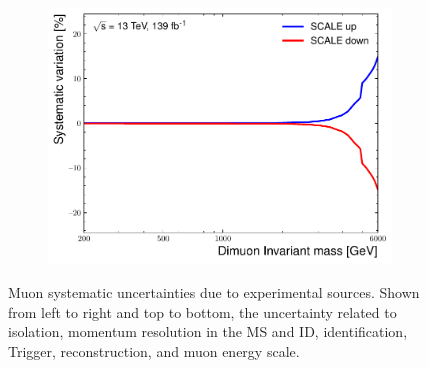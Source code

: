 \begin{figure}[]
\begin{subfigure}[b]{0.42\textwidth}
        \label{fig:uncert:mmReco}
    \end{subfigure}
    \begin{subfigure}[b]{0.42\textwidth}
        \centering
        \includegraphics[width=\textwidth]{figures/analysis/datamc/Uncertainties/exp/mm/m_uu_pstOR_MUON_SCALE__1up.pdf}
        \label{fig:uncert:mmScale}
    \end{subfigure}
    \caption[Muon systematic uncertainties due to experimental sources]{Muon systematic uncertainties due to experimental sources. Shown from left to right and top to bottom, the uncertainty related to isolation, momentum resolution in the MS and ID, identification, Trigger, reconstruction, and muon energy scale.}
    \label{fig:uncert:mmExp}
\end{figure}

